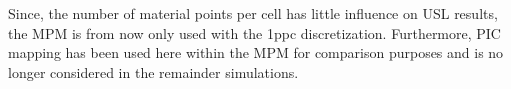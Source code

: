 Since, the number of material points per cell has little influence on USL results, the MPM is from now only used with the 1ppc discretization.
Furthermore, PIC mapping has been used here within the MPM for comparison purposes and is no longer considered in the remainder simulations.

